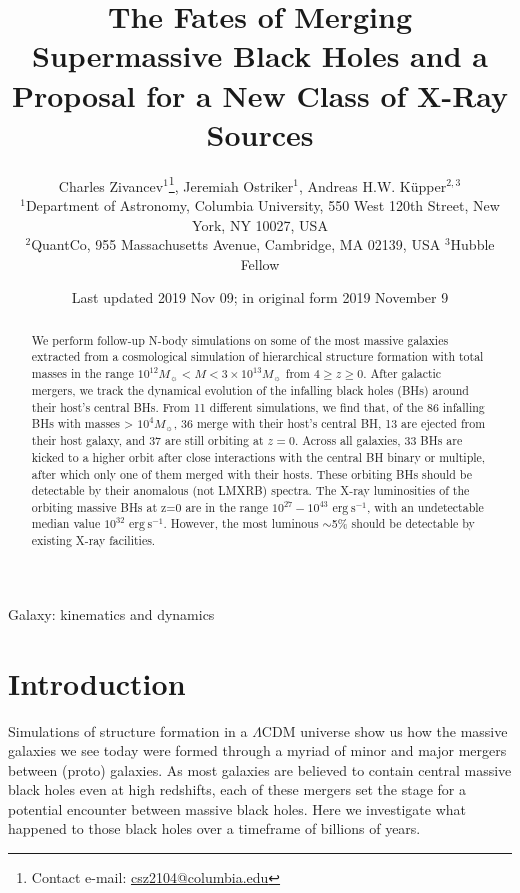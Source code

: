 \documentclass[fleqn,usenatbib,useAMS]{mnras}
\title[MNRAS]{The Fates of Merging Supermassive Black Holes and a Proposal for a New Class of X-Ray Sources}
\author[]{
Charles Zivancev$^{1}$\thanks{Contact e-mail: \href{mailto:csz2104@columbia.edu}{csz2104@columbia.edu}},
Jeremiah Ostriker$^{1}$,
Andreas H.W. K\"upper$^{2,3}$
\\
$^{1}$Department of Astronomy, Columbia University, 550 West 120th Street, New York, NY 10027, USA\\
$^{2}$QuantCo, 955 Massachusetts Avenue, Cambridge, MA 02139, USA
$^{3}$Hubble Fellow\\
}
\date{Last updated 2019 Nov 09; in original form 2019 November 9}
\begin{document}
\label{firstpage}
\pagerange{\pageref{firstpage}--\pageref{lastpage}}
\maketitle



\begin{abstract}
We perform follow-up N-body simulations on some of the most massive galaxies extracted from a cosmological simulation of hierarchical structure formation with total masses in the range $10^{12} M_{\sun} < M < 3\times 10^{13} M_{\sun}$ from $4\geq z \geq 0$.  After galactic mergers, we track the dynamical evolution of the infalling black holes (BHs) around their host's central BHs.  From 11 different simulations, we find that, of the 86 infalling BHs with masses > $10^4 M_{\sun}$, 36 merge with their host's central BH, 13 are ejected from their host galaxy, and 37 are still orbiting at $z=0$.  Across all galaxies, 33 BHs are kicked to a higher orbit after close interactions with the central BH binary or multiple, after which only one of them merged with their hosts.  These orbiting BHs should be detectable by their anomalous (not LMXRB) spectra.  The X-ray luminosities of the orbiting massive BHs at z=0 are in the range $10^{27}-10^{43}$ $\mathrm{erg}~\mathrm{s}^{-1}$, with an undetectable median value $10^{32}$ $\mathrm{erg}~\mathrm{s}^{-1}$.  However, the most luminous $\sim$5\% should be detectable by existing X-ray facilities.
\end{abstract}


\begin{keywords}
Galaxy: kinematics and dynamics
\end{keywords}




\section{Introduction}\label{sec:introduction}
Simulations of structure formation in a $\Lambda$CDM universe show us how the massive galaxies we see today were formed through a myriad of minor and major mergers between (proto) galaxies. As most galaxies are believed to contain central massive black holes even at high redshifts, each of these mergers set the stage for a potential encounter between massive black holes. Here we investigate what happened to those black holes over a timeframe of billions of years.
\end{document}
